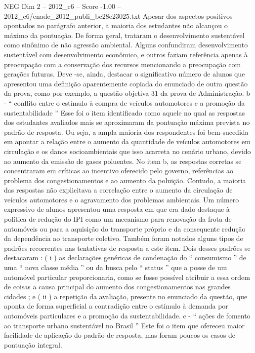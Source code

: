 \begin{textsample}{NEG Dim 2 – 2012\_c6 – Score -1.00 – 2012\_c6/enade\_2012\_publi\_bc28e23025.txt}
Apesar dos aspectos positivos apontados no parágrafo anterior, a maioria dos estudantes não alcançou o máximo da pontuação.
De forma geral, trataram o desenvolvimento sustentável como sinônimo de não agressão ambiental.
Alguns confundiram desenvolvimento sustentável com desenvolvimento econômico, e outros faziam referência apenas à preocupação com a conservação dos recursos mencionando a preocupação com gerações futuras.
Deve -se, ainda, destacar o significativo número de alunos que apresentou uma definição aparentemente copiada do enunciado de outra questão da prova, como por exemplo, a questão objetiva 31 da prova de Administração. b - “ conflito entre o estímulo à compra de veículos automotores e a promoção da sustentabilidade ” Esse foi o item identificado como aquele no qual as respostas dos estudantes avaliados mais se aproximaram da pontuação máxima prevista no padrão de resposta.
Ou seja, a ampla maioria dos respondentes foi bem-sucedida em apontar a relação entre o aumento da quantidade de veículos automotores em circulação e os danos socioambientais que isso acarreta no cenário urbano, devido ao aumento da emissão de gases poluentes.
No item b, as respostas corretas se concentraram em críticas ao incentivo oferecido pelo governo, referências ao problema dos congestionamentos e ao aumento da poluição.
Contudo, a maioria das respostas não explicitava a correlação entre o aumento da circulação de veículos automotores e o agravamento dos problemas ambientais.
Um número expressivo de alunos apresentou uma resposta em que era dado destaque à política de redução do IPI como um mecanismo para renovação da frota de automóveis ou para a aquisição do transporte próprio e da consequente redução da dependência ao transporte coletivo.
Também foram notados alguns tipos de padrões recorrentes nas tentativas de resposta a este item.
Dois desses padrões se destacaram : ( i ) as declarações genéricas de condenação do “ consumismo ” de uma “ nova classe média ” ou da busca pelo “ status ” que a posse de um automóvel particular proporcionaria, como se fosse possível atribuir a essa ordem de coisas a causa principal do aumento dos congestionamentos nas grandes cidades ; e ( ii ) a repetição da avaliação, presente no enunciado da questão, que aponta de forma superficial a contradição entre o estímulo à demanda por automóveis particulares e a promoção da sustentabilidade. c - “ ações de fomento ao transporte urbano sustentável no Brasil ” Este foi o item que ofereceu maior facilidade de aplicação do padrão de resposta, mas foram poucos os casos de pontuação integral.

\end{textsample}
